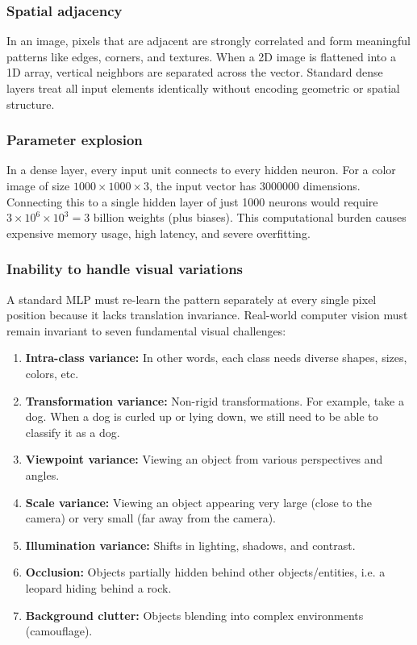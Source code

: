 \documentclass[11pt]{article}
\begin{document}
\subsubsection{Spatial adjacency}
In an image, pixels that are adjacent are strongly correlated and form meaningful patterns like edges, corners, and textures. 
When a 2D image is flattened into a 1D array, vertical neighbors are separated across the vector. 
Standard dense layers treat all input elements identically without encoding geometric or spatial structure.
\subsubsection{Parameter explosion}
In a dense layer, every input unit connects to every hidden neuron. For a color image of size $1000\times 1000\times 3$, the input vector has 3000000 dimensions.
Connecting this to a single hidden layer of just 1000 neurons would require $3\times 10^6\times 10^3=3$ billion weights (plus biases).
This computational burden causes expensive memory usage, high latency, and severe overfitting.
\subsubsection{Inability to handle visual variations}
A standard MLP must re-learn the pattern separately at every single pixel position because it lacks translation invariance.
Real-world computer vision must remain invariant to seven fundamental visual challenges:
\begin{enumerate}
    \item \textbf{Intra-class variance:} In other words, each class needs diverse shapes, sizes, colors, etc. 
    \item \textbf{Transformation variance:} Non-rigid transformations. For example, take a dog. When a dog is curled up or lying down, we still need to be able to classify it as a dog.
    \item \textbf{Viewpoint variance:} Viewing an object from various perspectives and angles.
    \item \textbf{Scale variance:} Viewing an object appearing very large (close to the camera) or very small (far away from the camera).
    \item \textbf{Illumination variance:} Shifts in lighting, shadows, and contrast.
    \item \textbf{Occlusion:} Objects partially hidden behind other objects/entities, i.e. a leopard hiding behind a rock.
    \item \textbf{Background clutter:} Objects blending into complex environments (camouflage).
\end{enumerate}
\end{document}

